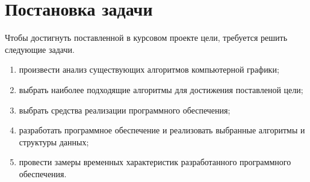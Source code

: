 \chapter*{Постановка задачи}

Чтобы достигнуть поставленной в курсовом проекте цели, требуется решить следующие задачи.
\begin{enumerate}[label=---]
    \item произвести анализ существующих алгоритмов компьютерной графики;
    \item выбрать наиболее подходящие алгоритмы для достижения поставленой цели;
    \item выбрать средства реализации программного обеспечения;
    \item разработать программное обеспечение и реализовать выбранные алгоритмы и структуры данных;
    \item провести замеры временных характеристик разработанного программного обеспечения.
\end{enumerate}